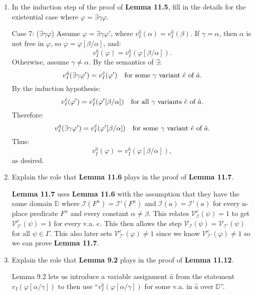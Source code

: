 \documentclass[12pt]{article}
\newcommand{\I}{\mathcal{I}} %
\newcommand{\V}[1]{\mathcal{V}_{#1}} %
\newcommand{\answer}[1]{%
  \par\noindent
  \begin{tcolorbox}[colback=gray!10, colframe=gray!80, title=Proof]
    #1
  \end{tcolorbox}
}
\begin{document}
\begin{itemize}[leftmargin=1.5in]
\begin{enumerate}[leftmargin=-.5in]
        \pagebreak
      \item In the induction step of the proof of \textbf{Lemma 11.5}, fill in the details for the existential case where $\varphi=\exists\gamma\varphi$.
        \answer{
          Case 7: (\( \exists \gamma \varphi \))
          Assume \( \varphi = \exists \gamma \varphi' \), where \( v_I^{\hat{a}}(\alpha) = v_I^{\hat{a}}(\beta) \).  
          If \( \gamma = \alpha \), then \( \alpha \) is not free in \( \varphi \), so \( \varphi = \varphi[\beta/\alpha] \), and:
          \[
          v_I^{\hat{a}}(\varphi) = v_I^{\hat{a}}(\varphi[\beta/\alpha]).
          \]
          Otherwise, assume \( \gamma \neq \alpha \). By the semantics of \( \exists \):
          \[
          v_I^{\hat{a}}(\exists \gamma \varphi') = v_I^{\hat{e}}(\varphi') \quad \text{for some \( \gamma \) variant } \hat{e} \text{ of } \hat{a}.
          \]
          By the induction hypothesis:
          \[
          v_I^{\hat{e}}(\varphi') = v_I^{\hat{e}}(\varphi'[\beta/\alpha]) \quad \text{for all \( \gamma \) variants \( \hat{e} \) of \( \hat{a} \)}.
          \]
          Therefore:
          \[
          v_I^{\hat{a}}(\exists \gamma \varphi') = v_I^{\hat{e}}(\varphi'[\beta/\alpha]) \quad \text{for some \( \gamma \) variant \( \hat{e} \) of \( \hat{a} \)}.
          \]
          Thus:
          \[
          v_I^{\hat{a}}(\varphi) = v_I^{\hat{a}}(\varphi[\beta/\alpha]),
          \]
          as desired.
        }
      \item Explain the role that \textbf{Lemma 11.6} plays in the proof of \textbf{Lemma 11.7}.
        \answer{
          \textbf{Lemma 11.7} uses \textbf{Lemma 11.6} with the assumption that they have the same
          domain $\mathbb{D}$ where $\I(F^n) = \I'(F^n)$ and $\I(a) = \I'(a)$ for every n-place predicate
          $F^n$ and every constant $\alpha \neq \beta$. This relates $\V{\I}^e(\psi) = 1$ to get $\V{\I'}^e(\psi) = 1$
          for every v.a. $e$. This then allows the step
          $\V{\I}(\psi) = \V{\I'}(\psi)$ for all $\psi \in \Gamma$. This also later sets
          $\V{\I'}^c(\varphi) \neq 1$ since we know $\V{\I'}^c(\varphi) \neq 1$ so we can prove \textbf{Lemma 11.7}.
        }
      \item Explain the role that \textbf{Lemma 9.2} plays in the proof of \textbf{Lemma 11.12}.
        \answer{
          Lemma 9.2 lets us introduce a variable assignment $\hat{a}$ from the statement
          $v_I(\varphi[\alpha/\gamma])$ to then use ``$v_I^{\hat{a}}(\varphi[\alpha/\gamma])$ for some v.a.
          in $\hat{a}$ over $\mathbb{D}$''.
        }
    \end{enumerate}
\end{itemize}
\end{document}
